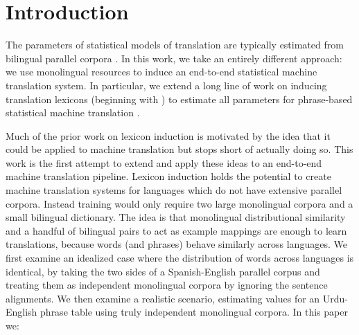 \documentclass[11pt]{article}
\newcommand{\mtodo}[1]{}
\begin{document}
\begin{abstract}
\end{abstract}


\section{Introduction} \label{sect:intro}

The parameters of statistical models of translation are typically estimated from bilingual parallel corpora \cite{Brown:1993}. 
In this work, we take an entirely different approach: we use monolingual resources to induce an end-to-end statistical machine translation system.  In particular, we extend a long line of work on inducing translation lexicons (beginning with ) to estimate all parameters for phrase-based statistical machine translation \cite{Koehn:2003}.

Much of the prior work on lexicon induction is motivated by the idea that it could be applied to machine translation but stops short of actually doing so.  This work is the first attempt to extend and apply these ideas to an end-to-end machine translation pipeline. 
Lexicon induction holds the potential to create machine translation systems for languages which do not have extensive parallel corpora. 
Instead training would only require two large monolingual corpora and a small bilingual dictionary. %
The idea is that monolingual distributional similarity and a handful of bilingual pairs to act as example mappings are enough to learn translations, because words (and phrases) behave similarly across languages.  
We first examine an idealized case where the distribution of words across languages is identical, by taking the two sides of a Spanish-English parallel corpus and treating them as independent monolingual corpora by ignoring the sentence alignments. 
We then examine a realistic scenario, estimating values for an Urdu-English phrase table using truly independent monolingual corpora.
In this paper we:
\end{document}
